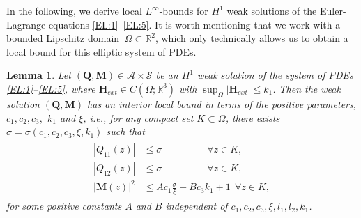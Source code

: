 \documentclass{article}
\newtheorem{lemma}[theorem]{Lemma}
\def\Qvec{\mathbf{Q}}
\def \Mvec{\mathbf{M}}
\def\Hvec{\mathbf{H}}
\begin{document}
In the following, we derive local $L^{\infty}$-bounds for $H^1$ weak solutions of the Euler-Lagrange equations \eqref{EL:1}--\eqref{EL:5}. It is worth mentioning that we work with a bounded Lipschitz domain $\ \Omega\subset\mathbb R^2$, which only technically allows us to obtain a local bound for this elliptic system of PDEs.
\begin{lemma}\label{lem1}
Let $\left(\Qvec, \Mvec\right)\in\mathcal{A}\times\mathcal{S}$ be an $H^1$ weak solution of the system of PDEs \eqref{EL:1}--\eqref{EL:5}, where $\Hvec_{ext}\in C\left(\overline{\Omega}; \mathbb R^3\right)$ with $\sup_{\bar{\Omega}}|\Hvec_{ext}|\le k_1$. Then the weak solution $\left(\Qvec, \Mvec\right)$ has an interior local bound in terms of the positive parameters, $c_1, c_2, c_3,$ $k_1$ and $\xi$, i.e., for any compact set $K\subset\Omega$, there exists $\sigma = \sigma\left(c_1, c_2, c_3, \xi, k_1\right)$ such that 
\begin{eqnarray} 
\begin{aligned}
|Q_{11}(z)| &\leq \sigma~~~~~~~~~~~~~~~~~~~~~\forall z\in K,\label{eq:Qmax}\\
|Q_{12}(z)| &\leq \sigma~~~~~~~~~~~~~~~~~~~~~\forall z\in K,\\
|\Mvec(z)|^2 &\leq A c_1 \frac{\sigma}{\xi} + Bc_3k_1 + 1~~\forall z\in K, \label{eq:Mmax}
\end{aligned}
\end{eqnarray}
for some positive constants $A$ and $B$ independent of $c_1, c_2, c_3, \xi, l_1, l_2, k_1$.
\end{lemma}
\end{document}

